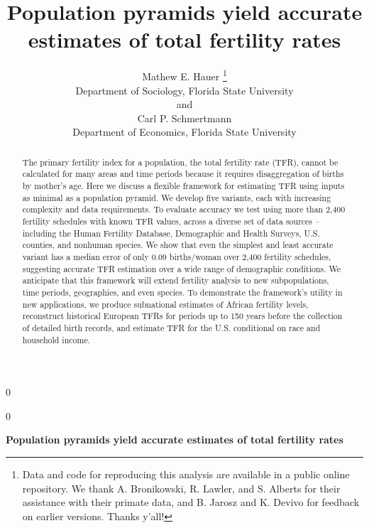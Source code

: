 \documentclass[12pt]{article}
\newcommand{\blind}{0}
\begin{document}
\def\spacingset#1{\renewcommand{\baselinestretch}%
{#1}\small\normalsize} \spacingset{1}



\blind
{
  \title{\bf Population pyramids yield accurate estimates of total fertility rates}

  \author{
        Mathew E. Hauer \thanks{Data and code for reproducing this analysis are available in a public
online repository. We thank A. Bronikowski, R. Lawler, and S. Alberts
for their assistance with their primate data, and B. Jarosz and K.
Devivo for feedback on earlier versions. Thanks y'all!} \\
    Department of Sociology, Florida State University\\
     and \\     Carl P. Schmertmann \\
    Department of Economics, Florida State University\\
      }
  \maketitle
} \fi

\blind
{
  \bigskip
  \bigskip
  \bigskip
  \begin{center}
    {\LARGE\bf Population pyramids yield accurate estimates of total fertility rates}
  \end{center}
  \medskip
} \fi

\bigskip
\begin{abstract}
The primary fertility index for a population, the total fertility rate
(TFR), cannot be calculated for many areas and time periods because it
requires disaggregation of births by mother's age. Here we discuss a
flexible framework for estimating TFR using inputs as minimal as a
population pyramid. We develop five variants, each with increasing
complexity and data requirements. To evaluate accuracy we test using
more than 2,400 fertility schedules with known TFR values, across a
diverse set of data sources -- including the Human Fertility Database,
Demographic and Health Surveys, U.S. counties, and nonhuman species. We
show that even the simplest and least accurate variant has a median
error of only 0.09 births/woman over 2,400 fertility schedules,
suggesting accurate TFR estimation over a wide range of demographic
conditions. We anticipate that this framework will extend fertility
analysis to new subpopulations, time periods, geographies, and even
species. To demonstrate the framework's utility in new applications, we
produce subnational estimates of African fertility levels, reconstruct
historical European TFRs for periods up to 150 years before the
collection of detailed birth records, and estimate TFR for the U.S.
conditional on race and household income.
\end{abstract}
\end{document}
